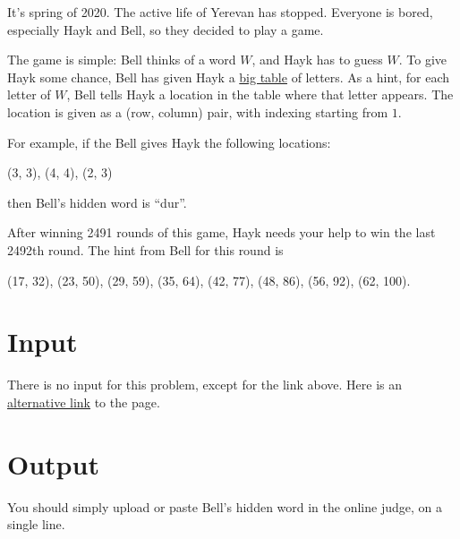 It's spring of 2020.
The active life of Yerevan has stopped.
Everyone is bored, especially Hayk and Bell, so they decided to play a game.

The game is simple: Bell thinks of a word $W$, and Hayk has to guess $W$.
To give Hayk some chance, Bell has given Hayk a \href{http://ejudge.rau.am/ejudge/hayktable.html}{big table} of letters.
As a hint, for each letter of $W$, Bell tells Hayk a location in the table where that letter appears.
The location is given as a (row, column) pair, with indexing starting from $1$.

For example, if the Bell gives Hayk the following locations:
\begin{center}
    (3, 3), (4, 4), (2, 3)
\end{center}
then Bell's hidden word is ``dur''.

After winning 2491 rounds of this game, Hayk needs your help to win the last 2492th round.
The hint from Bell for this round is
\begin{center}
    (17, 32), (23, 50), (29, 59), (35, 64), (42, 77), (48, 86), (56, 92), (62, 100).
\end{center}

\section*{Input}
There is no input for this problem, except for the link above.
Here is an \href{http://167.71.248.201/ejudge/hayktable.html}{alternative link} to the page.

\section*{Output}
You should simply upload or paste Bell's hidden word in the online judge, on a single line.

